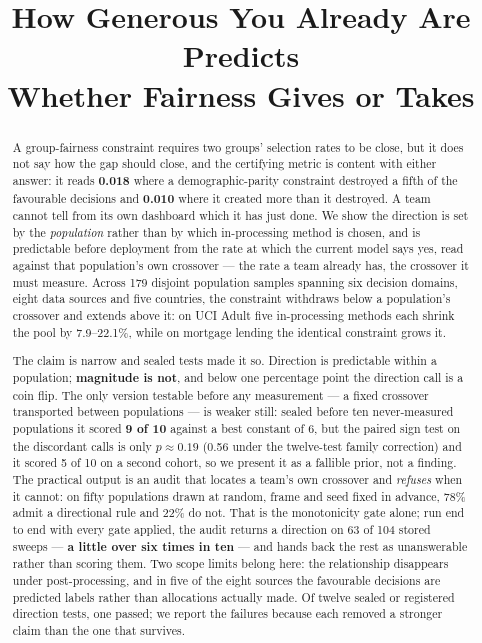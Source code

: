 \documentclass[conference]{IEEEtran}
\begin{document}
\title{How Generous You Already Are Predicts\\
Whether Fairness Gives or Takes}

\author{
}

\maketitle

\begin{abstract}
A group-fairness constraint requires two groups' selection rates to be close, but it does not
say how the gap should close, and the certifying metric is content with either answer: it
reads \textbf{0.018} where a demographic-parity constraint destroyed a fifth of the favourable
decisions and \textbf{0.010} where it created more than it destroyed. A team cannot tell from
its own dashboard which it has just done. We show the direction is set by the
\emph{population} rather than by which in-processing method is chosen, and is predictable
before deployment from the rate at which the current model says yes, read against that
population's own crossover --- the rate a team already has, the crossover it must measure.
Across 179 disjoint population samples spanning six decision domains, eight data sources and
five countries, the constraint withdraws below a population's crossover and extends above it:
on UCI Adult five in-processing methods each shrink the pool by 7.9--22.1\%, while on mortgage lending the identical constraint grows it.

The claim is narrow and sealed tests made it so. Direction is predictable within a population;
\textbf{magnitude is not}, and below one percentage point the direction call is a coin flip. The only version testable before any measurement --- a fixed crossover transported between populations --- is weaker still: sealed before ten never-measured populations it scored \textbf{9 of 10} against a best constant of 6, but the paired sign test on the discordant calls is only $p \approx 0.19$ (0.56 under the twelve-test family correction) and it scored 5 of 10 on a second cohort, so we present it as a fallible prior, not a finding. The practical output is an audit that locates a team's own crossover and \emph{refuses} when
it cannot: on fifty populations drawn at random, frame and seed fixed in advance, 78\% admit a
directional rule and 22\% do not. That is the monotonicity gate alone; run end to end with every
gate applied, the audit returns a direction on 63 of 104 stored sweeps --- \textbf{a little over six times in ten} --- and hands back the rest as unanswerable rather than scoring them. Two scope limits belong here: the relationship disappears under
post-processing, and in five of the eight sources the favourable decisions are predicted
labels rather than allocations actually made. Of twelve sealed or registered direction tests, one passed; we report the failures because each removed a stronger claim than the one that
survives.
\end{abstract}
\end{document}
